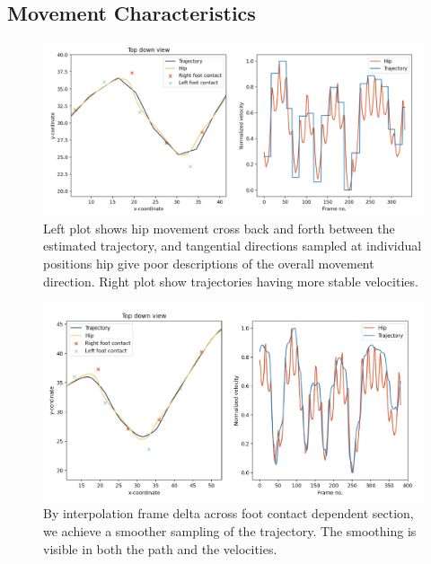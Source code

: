 \subsection{Movement Characteristics}
\begin{figure}
    \centering
    \includegraphics[width=1.0\columnwidth]{img/trajectory_estimation.png}
    \caption{Left plot shows hip movement cross back and forth between the estimated trajectory, and tangential directions sampled at individual positions hip give poor descriptions of the overall movement direction. Right plot show trajectories having more stable velocities.}
    \label{fig:results:trajectory_estimation}
\end{figure}

\begin{figure}
    \centering
    \includegraphics[width=1.0\columnwidth]{img/trajectory_estimation_smooth.png}
    \caption{By interpolation frame delta across foot contact dependent section, we achieve a smoother sampling of the trajectory. The smoothing is visible in both the path and the velocities.}
    \label{fig:results:trajectory_estimation_smooth}
\end{figure}

